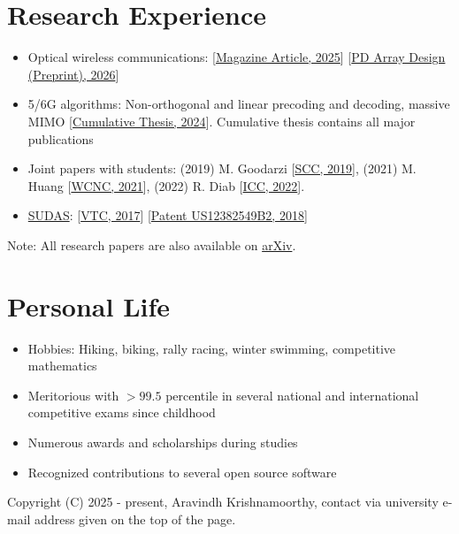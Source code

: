 \documentclass[a4paper,dvipsnames]{report}
\begin{document}
\section*{Research Experience}
\begin{itemize}
	\item Optical wireless communications: [\href{https://ieeexplore.ieee.org/abstract/document/10974735}{Magazine Article, 2025}] [\href{https://arxiv.org/abs/2601.15973}{PD Array Design (Preprint), 2026}]
	\item 5/6G algorithms: Non-orthogonal and linear precoding and decoding, massive MIMO [\href{https://open.fau.de/handle/openfau/31976}{Cumulative Thesis, 2024}]. Cumulative thesis contains all major publications
	\item Joint papers with students: (2019) M. Goodarzi [\href{https://ieeexplore.ieee.org/abstract/document/8661311}{SCC, 2019}], (2021) M. Huang [\href{https://doi.org/10.1109/WCNC49053.2021.9417424}{WCNC, 2021}], (2022) R. Diab [\href{https://ieeexplore.ieee.org/document/9814475}{ICC, 2022}].
	\item \href{https://www.iis.fraunhofer.de/en/ff/kom/mobile-kom/sudas.html}{SUDAS}: [\href{https://ieeexplore.ieee.org/abstract/document/8287949}{VTC, 2017}] [\href{https://patents.google.com/patent/US12382549B2/en}{Patent US12382549B2, 2018}]
\end{itemize}
Note: All research papers are also available on \href{https://arxiv.org/a/krishnamoorthy_a_1.html}{arXiv}.

\hrulefill
\section*{Personal Life}
\begin{itemize}
	\item Hobbies: Hiking, biking, rally racing, winter swimming, competitive mathematics
	\item Meritorious with $> 99.5$ percentile in several national and international competitive exams since childhood
	\item Numerous awards and scholarships during studies
	\item Recognized contributions to several open source software
\end{itemize}
\hrulefill
\begin{center}
	Copyright (C) 2025 - present, Aravindh Krishnamoorthy, contact via university e-mail address given on the top of the page.
\end{center}
\end{document}
